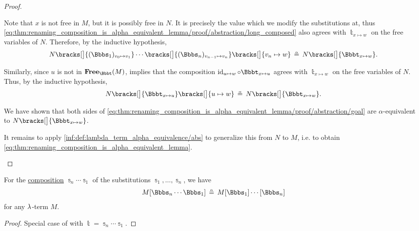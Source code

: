 \begin{proof}
\begin{itemize}
    Note that \( x \) is not free in \( M \), but it is possibly free in \( N \). It is precisely the value which we modify the substitutions at, thus \eqref{eq:thm:renaming_composition_is_alpha_equivalent_lemma/proof/abstraction/long_composed} also agrees with \( \Bbbt_{x \mapsto w} \) on the free variables of \( N \). Therefore, by the inductive hypothesis,
    \begin{equation*}
      N\bracks[\big]{ (\Bbbs_1)_{v_0 \mapsto v_1} } \cdots \bracks[\big]{ (\Bbbs_n)_{v_{n-1} \mapsto v_n} } \bracks[\big]{ v_n \mapsto w }
      \aequiv
      N\bracks[\big]{ \Bbbt_{x \mapsto w} }.
    \end{equation*}

    Similarly, since \( u \) is not in \( \op*{Free}_\Bbbt(M) \),  implies that the composition \( \id_{u \mapsto w} \bincirc \Bbbt_{x \mapsto u} \) agrees with \( \Bbbt_{x \mapsto w} \) on the free variables of \( N \). Thus, by the inductive hypothesis,
    \begin{equation*}
      N\bracks[\big]{ \Bbbt_{x \mapsto u} }\bracks[\big]{ u \mapsto w }
      \aequiv
      N\bracks[\big]{ \Bbbt_{x \mapsto w} }.
    \end{equation*}

    We have shown that both sides of \eqref{eq:thm:renaming_composition_is_alpha_equivalent_lemma/proof/abstraction/goal} are \( \alpha \)-equivalent to \( N\bracks[\big]{ \Bbbt_{x \mapsto w} } \).

    It remains to apply \ref{inf:def:lambda_term_alpha_equivalence/abs} to generalize this from \( N \) to \( M \), i.e. to obtain \eqref{eq:thm:renaming_composition_is_alpha_equivalent_lemma}.
  \end{itemize}
\end{proof}

\begin{corollary}\label{thm:nary_substitution_composition_is_alpha_equivalent}
  For the \hyperref[def:lambda_substitution_composition]{composition} \( \Bbbs_n \cdots \Bbbs_1 \) of the substitutions \( \Bbbs_1, \ldots, \Bbbs_n \), we have
  \begin{equation}\label{eq:thm:nary_substitution_composition_is_alpha_equivalent}
    M[\Bbbs_n \cdots \Bbbs_1] \aequiv M[\Bbbs_1] \cdots [\Bbbs_n]
  \end{equation}
  for any \( {\mathrm \lambda} \)-term \( M \).
\end{corollary}
\begin{proof}
  Special case of  with \( \Bbbt = \Bbbs_n \cdots \Bbbs_1 \).
\end{proof}


